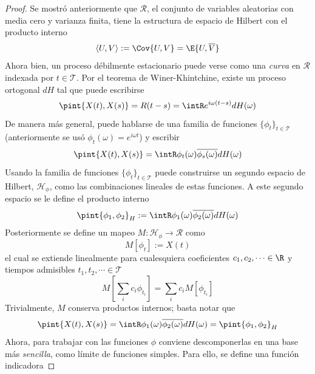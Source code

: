 \begin{proof}
Se mostró anteriormente que $\mathcal{R}$, el conjunto de variables aleatorias con media cero y varianza finita, tiene la estructura de espacio de Hilbert con el producto interno
\begin{equation}
\langle U , V \rangle := \Cov{U,V} = \E{U, \overline{V}}
\end{equation}
Ahora bien, un proceso débilmente estacionario \xt puede verse como una \textit{curva} en $\mathcal{R}$ indexada por $t \in \mathcal{T}$.
%
Por el teorema de Winer-Khintchine, existe un proceso ortogonal $dH$ tal que puede escribirse
\begin{equation}
\pint{X(t),X(s)} = R(t-s) = \intR e^{i \omega (t-s)} dH(\omega)
\end{equation} 
De manera más general, puede hablarse de una familia de funciones $\{ \phi_t \}_{t\in \mathcal{T}}$ (anteriormente se usó $\phi_t(\omega) = e^{i \omega t}$) y escribir
\begin{equation}
\pint{X(t),X(s)} = \intR \phi_t(\omega) \overline{\phi_s(\omega)} dH(\omega)
\end{equation} 
Usando la familia de funciones $\{ \phi_t \}_{t\in \mathcal{T}}$ puede construirse un segundo espacio de Hilbert, $\mathcal{H}_\phi$, como las combinaciones lineales de estas funciones.
A este segundo espacio se le define el producto interno
\begin{equation}
\pint{\phi_1,\phi_2}_H := \intR \phi_1(\omega) \overline{\phi_2(\omega)} dH(\omega)
\end{equation} 
Posteriormente se define un mapeo $M : \mathcal{H}_\phi \rightarrow \mathcal{R}$ como
\begin{equation}
M[\phi_t] := X(t)
\end{equation}
el cual se extiende linealmente para cualesquiera coeficientes $c_1, c_2, \cdots \in \R$ y tiempos admisibles $t_1, t_2, \cdots \in \mathcal{T}$
\begin{equation}
M\left[ \sum_i c_i \phi_{t_i} \right] = \sum_i c_i M\left[ \phi_{t_i} \right]
\end{equation}
Trivialmente, $M$ conserva productos internos; basta notar que
\begin{equation}
\pint{X(t),X(s)} = \intR \phi_1(\omega) \overline{\phi_2(\omega)} dH(\omega) = \pint{\phi_1,\phi_2}_H
\end{equation}
Ahora, para trabajar con las funciones $\phi$ conviene descomponerlas en una base más \textit{sencilla}, como límite de funciones simples. Para ello, se define una función indicadora

\end{proof}
